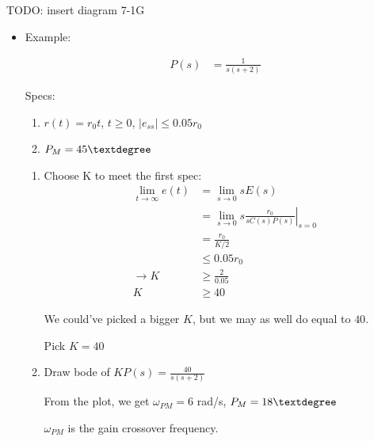 \begin{enumerate}
\begin{enumerate}
\begin{enumerate}
                        TODO: insert diagram 7-1G
                \end{enumerate}

                \begin{itemize}
                    \item Example:

                        \begin{align*}
                            P(s) &= \frac{1}{s(s+2)}
                        \end{align*}

                        Specs:
                        \begin{enumerate}
                            \item $r(t) = r_0 t$, $t \ge 0$, $|e_{ss}| \le 0.05 r_0$
                            \item $P_M = 45 \textdegree$
                        \end{enumerate}

                        \begin{enumerate}
                            \item Choose K to meet the first spec:
                                \begin{align*}
                                    \lim_{t \to \infty}e(t) &= \lim_{s \to 0}s E(s) \\
                                    &= \lim_{s \to 0}s \left. \frac{r_0}{sC(s)P(s)} \right|_{s = 0} \\
                                    &= \frac{r_0}{K / 2} \\
                                    &\le 0.05 r_0 \\
                                    \rightarrow K &\ge \frac{2}{0.05} \\
                                    K &\ge 40
                                \end{align*}


                                We could've picked a bigger $K$, but we may as well do equal to $40$.

                                Pick $K = 40$
                            \item Draw bode of $KP(s) = \frac{40}{s(s+2)}$

                                From the plot, we get $\omega_{PM} = 6$ rad/s, $P_M = 18 \textdegree$

                                $\omega_{PM}$ is the gain crossover frequency.


\end{enumerate}
\end{itemize}
\end{enumerate}
\end{enumerate}
